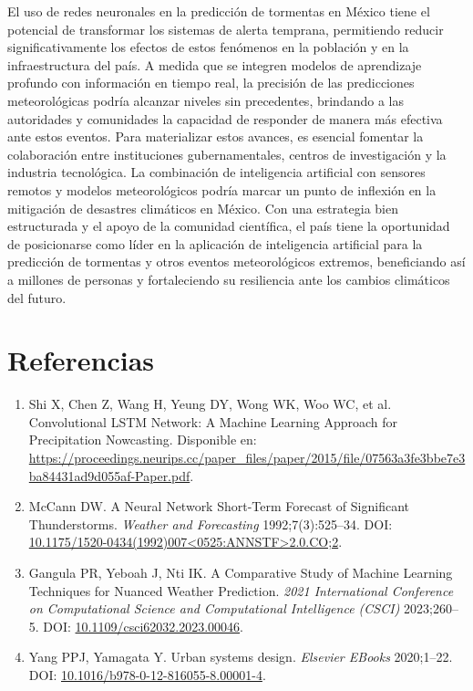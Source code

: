 \documentclass{article}
\begin{document}
El uso de redes neuronales en la predicción de tormentas en México tiene el potencial de transformar los sistemas de alerta temprana, permitiendo reducir significativamente los efectos de estos fenómenos en la población y en la infraestructura del país. A medida que se integren modelos de aprendizaje profundo con información en tiempo real, la precisión de las predicciones meteorológicas podría alcanzar niveles sin precedentes, brindando a las autoridades y comunidades la capacidad de responder de manera más efectiva ante estos eventos.
Para materializar estos avances, es esencial fomentar la colaboración entre instituciones gubernamentales, centros de investigación y la industria tecnológica. La combinación de inteligencia artificial con sensores remotos y modelos meteorológicos podría marcar un punto de inflexión en la mitigación de desastres climáticos en México. Con una estrategia bien estructurada y el apoyo de la comunidad científica, el país tiene la oportunidad de posicionarse como líder en la aplicación de inteligencia artificial para la predicción de tormentas y otros eventos meteorológicos extremos, beneficiando así a millones de personas y fortaleciendo su resiliencia ante los cambios climáticos del futuro.


\section{Referencias}
\begin{enumerate}
    \item Shi X, Chen Z, Wang H, Yeung DY, Wong WK, Woo WC, et al. Convolutional LSTM Network: A Machine Learning Approach for Precipitation Nowcasting. Disponible en: \url{https://proceedings.neurips.cc/paper_files/paper/2015/file/07563a3fe3bbe7e3ba84431ad9d055af-Paper.pdf}.
    \item McCann DW. A Neural Network Short-Term Forecast of Significant Thunderstorms. \textit{Weather and Forecasting} 1992;7(3):525–34. DOI: \url{10.1175/1520-0434(1992)007<0525:ANNSTF>2.0.CO;2}.
    \item Gangula PR, Yeboah J, Nti IK. A Comparative Study of Machine Learning Techniques for Nuanced Weather Prediction. \textit{2021 International Conference on Computational Science and Computational Intelligence (CSCI)} 2023;260–5. DOI: \url{10.1109/csci62032.2023.00046}.
    \item Yang PPJ, Yamagata Y. Urban systems design. \textit{Elsevier EBooks} 2020;1–22. DOI: \url{10.1016/b978-0-12-816055-8.00001-4}.
\end{enumerate}
\end{document}
